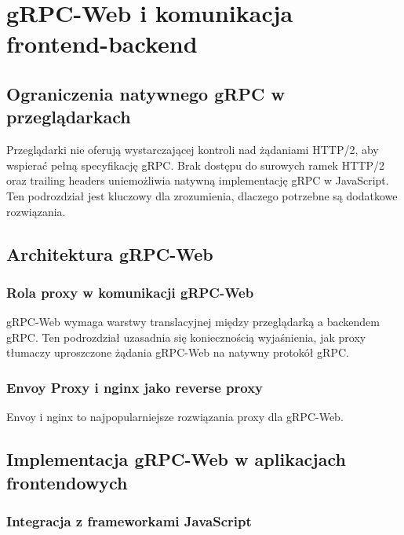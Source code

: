 \cleardoublepage

\chapter{gRPC-Web i komunikacja frontend-backend}
\label{cha:gRPCWeb}

\section{Ograniczenia natywnego gRPC w przeglądarkach}
\label{sec:OgraniczeniagRPC}

Przeglądarki nie oferują wystarczającej kontroli nad żądaniami HTTP/2, aby wspierać pełną specyfikację gRPC. Brak dostępu do surowych ramek HTTP/2 oraz trailing headers uniemożliwia natywną implementację gRPC w JavaScript. Ten podrozdział jest kluczowy dla zrozumienia, dlaczego potrzebne są dodatkowe rozwiązania.

\section{Architektura gRPC-Web}
\label{sec:ArchitekturagRPCWeb}

\subsection{Rola proxy w komunikacji gRPC-Web}
\label{subsec:RolaProxy}

gRPC-Web wymaga warstwy translacyjnej między przeglądarką a backendem gRPC. Ten podrozdział uzasadnia się koniecznością wyjaśnienia, jak proxy tłumaczy uproszczone żądania gRPC-Web na natywny protokół gRPC. 

\subsection{Envoy Proxy i nginx jako reverse proxy}
\label{subsec:EnvoyNginx}

Envoy i nginx to najpopularniejsze rozwiązania proxy dla gRPC-Web.

\section{Implementacja gRPC-Web w aplikacjach frontendowych}
\label{sec:ImplementacjagRPCWeb}

\subsection{Integracja z frameworkami JavaScript}
\label{subsec:IntegracjaJavaScript}


